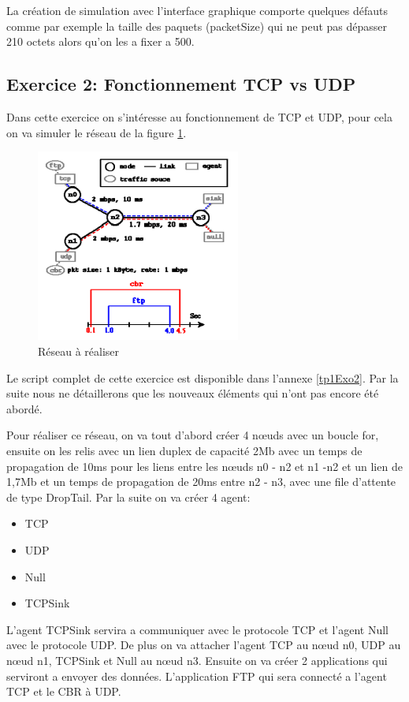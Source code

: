 \documentclass[11pt]{article}
\begin{document}
La création de simulation avec l'interface graphique comporte quelques défauts comme par exemple la taille des paquets (packetSize) qui ne peut pas dépasser 210 octets alors qu'on les a fixer a 500.

\subsection{Exercice 2: Fonctionnement TCP vs UDP}

Dans cette exercice on s’intéresse au fonctionnement de TCP et UDP, pour cela on va simuler le réseau de la figure \ref{resSimu}.

\begin{figure}[H]
	\begin{center}
		\includegraphics[width=0.6\textwidth]{assets/tp1/reseauAFaire.png}
	\end{center}
	\caption{Réseau à réaliser}
	\label{resSimu}
\end{figure}

Le script complet de cette exercice est disponible dans l'annexe \ref{tp1Exo2}. Par la suite nous ne détaillerons que les nouveaux éléments qui n'ont pas encore été abordé.

Pour réaliser ce réseau, on va tout d'abord créer 4 nœuds avec un boucle for, ensuite on les relis avec un lien duplex de capacité 2Mb avec un temps de propagation de 10ms pour les liens entre les nœuds n0 - n2 et n1 -n2 et un lien de 1,7Mb et un temps de propagation de 20ms entre n2 - n3, avec une file d'attente de type DropTail.
Par la suite on va créer 4 agent: 
\begin{itemize}
	\item TCP
	\item UDP
	\item Null
	\item TCPSink
\end{itemize}
L'agent TCPSink servira a communiquer avec le protocole TCP et l'agent Null avec le protocole UDP. De plus on va attacher l'agent TCP au nœud n0, UDP au nœud n1, TCPSink et Null au nœud n3. Ensuite on va créer 2 applications qui serviront a envoyer des données. L'application FTP qui sera connecté a l'agent TCP et le CBR à UDP.\\
\end{document}
